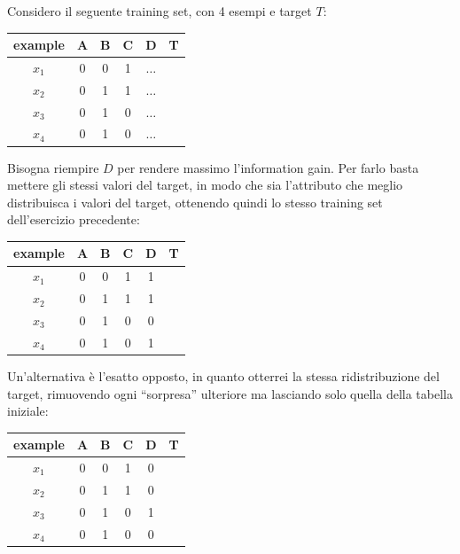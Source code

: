 \begin{esercizio}
  Considero il seguente training set, con 4 esempi e target $T$:
  \begin{table}[H]
    \centering
    \begin{tabular}{c|c|c|c|c|c}
      example & A & B & C & D & T\\
      \hline
      $x_1$ & 0 & 0 & 1 & $\ldots$ & \color{darkgreen}{1}\\
      $x_2$ & 0 & 1 & 1 & $\ldots$ & \color{darkgreen}{1}\\
      $x_3$ & 0 & 1 & 0 & $\ldots$ & \color{red}{0}\\
      $x_4$ & 0 & 1 & 0 & $\ldots$ & \color{darkgreen}{1}\\
    \end{tabular}
  \end{table}
  Bisogna riempire $D$ per rendere massimo l'information gain.
  \newpage
  Per farlo basta mettere gli stessi valori del target, in modo che sia
  l'attributo che meglio distribuisca i valori del target, ottenendo quindi lo
  stesso training set dell'esercizio precedente:
  \begin{table}[H]
    \centering
    \begin{tabular}{c|c|c|c|c|c}
      example & A & B & C & D & T\\
      \hline
      $x_1$ & 0 & 0 & 1 & 1 & \color{darkgreen}{1}\\
      $x_2$ & 0 & 1 & 1 & 1 & \color{darkgreen}{1}\\
      $x_3$ & 0 & 1 & 0 & 0 & \color{red}{0}\\
      $x_4$ & 0 & 1 & 0 & 1 & \color{darkgreen}{1}\\
    \end{tabular}
  \end{table}
  Un'alternativa è l'esatto opposto, in quanto otterrei la stessa
  ridistribuzione del target, rimuovendo ogni ``sorpresa'' ulteriore ma
  lasciando solo quella della tabella iniziale:
  \begin{table}[H]
    \centering
    \begin{tabular}{c|c|c|c|c|c}
      example & A & B & C & D & T\\
      \hline
      $x_1$ & 0 & 0 & 1 & 0 & \color{darkgreen}{1}\\
      $x_2$ & 0 & 1 & 1 & 0 & \color{darkgreen}{1}\\
      $x_3$ & 0 & 1 & 0 & 1 & \color{red}{0}\\
      $x_4$ & 0 & 1 & 0 & 0 & \color{darkgreen}{1}\\
    \end{tabular}
  \end{table}
\end{esercizio}
